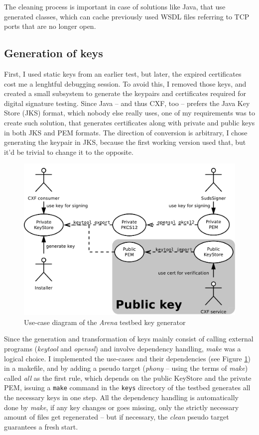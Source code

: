 The cleaning process is important in case of solutions like Java, that use generated classes, which can cache previously used WSDL files referring to TCP ports that are no longer open.

\subsection{Generation of keys}

First, I used static keys from an earlier test, but later, the expired certificates cost me a lenghtful debugging session. To avoid this, I removed those keys, and created a small subsystem to generate the keypairs and certificates required for digital signature testing. Since Java -- and thus CXF, too -- prefers the Java Key Store (JKS) format, which nobody else really uses, one of my requirements was to create such solution, that generates certificates along with private and public keys in both JKS and PEM formats. The direction of conversion is arbitrary, I chose generating the keypair in JKS, because the first working version used that, but it'd be trivial to change it to the opposite.

\begin{figure}[htbp]
 \centering
 \includegraphics[width=14cm]{images/ucdArenaKeys.pdf}
 \caption{Use-case diagram of the \emph{Arena} testbed key generator}
 \label{fig:ucdArenaKeys}
\end{figure}

Since the generation and transformation of keys mainly consist of calling external programs (\emph{keytool} and \emph{openssl}) and involve dependency handling, \emph{make} was a logical choice. I implemented the use-cases and their dependencies (see Figure \ref{fig:ucdArenaKeys}) in a makefile, and by adding a pseudo target (\emph{phony} -- using the terms of \emph{make}) called \emph{all} as the first rule, which depends on the public KeyStore and the private PEM, issuing a \verb|make| command in the \verb|keys| directory of the testbed generates all the necessary keys in one step. All the dependency handling is automatically done by \emph{make}, if any key changes or goes missing, only the strictly necessary amount of files get regenerated -- but if necessary, the \emph{clean} pseudo target guarantees a fresh start.

